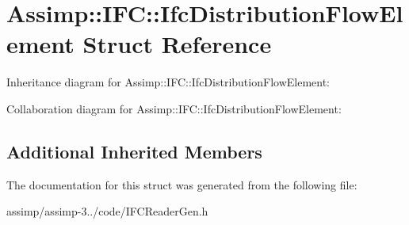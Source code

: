 \hypertarget{struct_assimp_1_1_i_f_c_1_1_ifc_distribution_flow_element}{\section{Assimp\+:\+:I\+F\+C\+:\+:Ifc\+Distribution\+Flow\+Element Struct Reference}
\label{struct_assimp_1_1_i_f_c_1_1_ifc_distribution_flow_element}
}


Inheritance diagram for Assimp\+:\+:I\+F\+C\+:\+:Ifc\+Distribution\+Flow\+Element\+:


Collaboration diagram for Assimp\+:\+:I\+F\+C\+:\+:Ifc\+Distribution\+Flow\+Element\+:
\subsection*{Additional Inherited Members}


The documentation for this struct was generated from the following file\+:\begin{DoxyCompactItemize}
\item 
assimp/assimp-\/3../code/I\+F\+C\+Reader\+Gen.\+h\end{DoxyCompactItemize}
